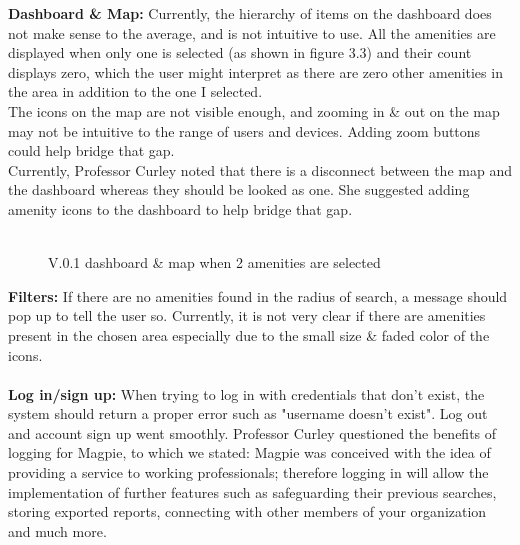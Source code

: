 \textbf{Dashboard \& Map: }
Currently, the hierarchy of items on the dashboard does not make sense to the average, and is not intuitive to use. All the amenities are displayed when only one is selected (as shown in figure 3.3) and their count displays zero, which the user might interpret as there are zero other amenities in the area in addition to the one I selected.\\
The icons on the map are not visible enough, and zooming in \& out on the map may not be intuitive to the range of users and devices. Adding zoom buttons could help bridge that gap. \\
Currently, Professor Curley noted that there is a disconnect between the map and the dashboard whereas they should be looked as one. She suggested adding amenity icons to the dashboard to help bridge that gap.\\ \\
\begin{figure}
    \caption{V.0.1 dashboard \& map when 2 amenities are selected}
\end{figure}
\textbf{Filters: }
If there are no amenities found in the radius of search, a message should pop up to tell the user so. Currently, it is not very clear if there are amenities present in the chosen area especially due to the small size \& faded color of the icons. \\ \\
\textbf{Log in/sign up: }
When trying to log in with credentials that don't exist, the system should return a proper error such as "username doesn't exist". Log out and account sign up went smoothly. Professor Curley questioned the benefits of logging for Magpie, to which we stated:
Magpie was conceived with the idea of providing a service to working professionals; therefore logging in will allow the implementation of further features such as safeguarding their previous searches, storing exported reports, connecting with other members of your organization and much more.\\ \\
